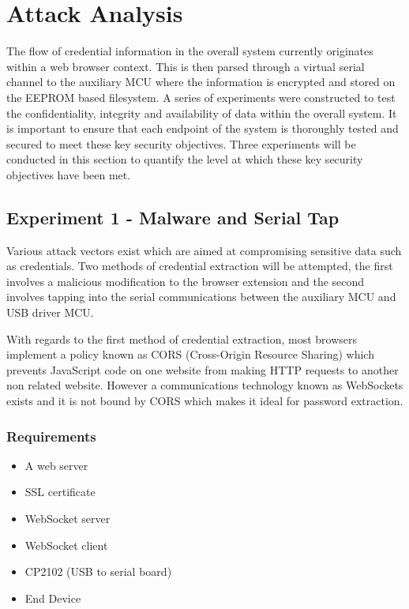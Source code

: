 \section{Attack Analysis}
The flow of credential information in the overall system currently originates within a web browser context. This is then parsed through a virtual serial channel to the auxiliary MCU where the information is encrypted and stored on the EEPROM based filesystem. A series of experiments were constructed to test the confidentiality, integrity and availability of data within the overall system. It is important to ensure that each endpoint of the system is thoroughly tested and secured to meet these key security objectives. Three experiments will be conducted in this section to quantify the level at which these key security objectives have been met.


\subsection{Experiment 1 - Malware and Serial Tap}

Various attack vectors exist which are aimed at compromising sensitive data such as credentials. Two methods of credential extraction will be attempted, the first involves a malicious modification to the browser extension and the second involves tapping into the serial communications between the auxiliary MCU and USB driver MCU.

With regards to the first method of credential extraction, most browsers implement a policy known as CORS (Cross-Origin Resource Sharing) which prevents JavaScript code on one website from making HTTP requests to another non related website. However a communications technology known as WebSockets exists and it is not bound by CORS which makes it ideal for password extraction.

\subsubsection{Requirements}

\begin{itemize}
  \item A web server
  \item SSL certificate 
  \item WebSocket server 
  \item WebSocket client 
  \item CP2102 (USB to serial board) 
  \item End Device 
\end{itemize}


